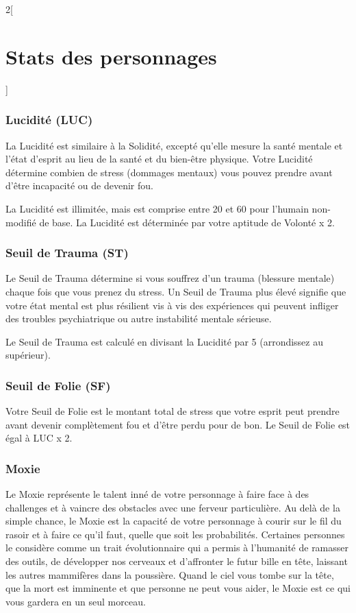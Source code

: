 \documentclass[a4paper,9pt]{article}
\begin{document}
\begin{multicols}{2}[\section{Stats des personnages} \label{sec:character-stats}]
\subsubsection{Lucidité (LUC)} \label{sec:lucidity-luc} 

La Lucidité est similaire à la Solidité, excepté qu'elle mesure la santé
mentale et l'état d'esprit au lieu de la santé et du bien-être physique. Votre
Lucidité détermine combien de stress (dommages mentaux) vous pouvez prendre
avant d'être incapacité ou de devenir fou. 

La Lucidité est illimitée, mais est comprise entre 20 et 60 pour l'humain
non-modifié de base. La Lucidité est déterminée par votre aptitude de Volonté x
2. 

\subsubsection{Seuil de Trauma (ST)} \label{sec:trauma-threshold-tt} 

Le Seuil de Trauma détermine si vous souffrez d'un trauma (blessure mentale)
chaque fois que vous prenez du stress. Un Seuil de Trauma plus élevé signifie
que votre état mental est plus résilient vis à vis des expériences qui peuvent
infliger des troubles psychiatrique ou autre instabilité mentale sérieuse. 

Le Seuil de Trauma est calculé en divisant la Lucidité par 5 (arrondissez au
supérieur). 

\subsubsection{Seuil de Folie (SF)} \label{sec:insanity-rating-ir} 

Votre Seuil de Folie est le montant total de stress que votre esprit peut
prendre avant devenir complètement fou et d'être perdu pour de bon. Le Seuil de
Folie est égal à LUC x 2. 

\subsubsection{Moxie} \label{sec:moxie} 

Le Moxie représente le talent inné de votre personnage à faire face à des
challenges et à vaincre des obstacles avec une ferveur particulière. Au delà de
la simple chance, le Moxie est la capacité de votre personnage à courir sur le
fil du rasoir et à faire ce qu'il faut, quelle que soit les probabilités.
Certaines personnes le considère comme un trait évolutionnaire qui a permis à
l'humanité de ramasser des outils, de développer nos cerveaux et d'affronter le
futur bille en tête, laissant les autres mammifères dans la poussière. Quand le
ciel vous tombe sur la tête, que la mort est imminente et que personne ne peut
vous aider, le Moxie est ce qui vous gardera en un seul morceau. 


\end{multicols}
\end{document}
